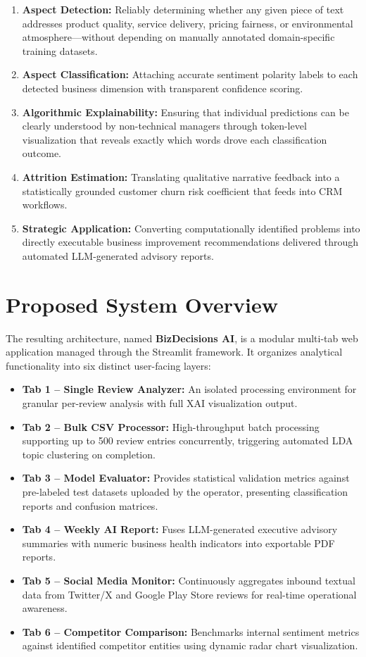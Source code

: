 \documentclass[12pt,a4paper]{report}
\begin{document}
\begin{enumerate}[leftmargin=2em]
  \item \textbf{Aspect Detection:} Reliably determining whether any given piece of text addresses product quality, service delivery, pricing fairness, or environmental atmosphere—without depending on manually annotated domain-specific training datasets.
  \item \textbf{Aspect Classification:} Attaching accurate sentiment polarity labels to each detected business dimension with transparent confidence scoring.
  \item \textbf{Algorithmic Explainability:} Ensuring that individual predictions can be clearly understood by non-technical managers through token-level visualization that reveals exactly which words drove each classification outcome.
  \item \textbf{Attrition Estimation:} Translating qualitative narrative feedback into a statistically grounded customer churn risk coefficient that feeds into CRM workflows.
  \item \textbf{Strategic Application:} Converting computationally identified problems into directly executable business improvement recommendations delivered through automated LLM-generated advisory reports.
\end{enumerate}

\section{Proposed System Overview}
The resulting architecture, named \textbf{BizDecisions AI}, is a modular multi-tab web application managed through the Streamlit framework. It organizes analytical functionality into six distinct user-facing layers:

\begin{itemize}[leftmargin=2em]
  \item \textbf{Tab 1 -- Single Review Analyzer:} An isolated processing environment for granular per-review analysis with full XAI visualization output.
  \item \textbf{Tab 2 -- Bulk CSV Processor:} High-throughput batch processing supporting up to 500 review entries concurrently, triggering automated LDA topic clustering on completion.
  \item \textbf{Tab 3 -- Model Evaluator:} Provides statistical validation metrics against pre-labeled test datasets uploaded by the operator, presenting classification reports and confusion matrices.
  \item \textbf{Tab 4 -- Weekly AI Report:} Fuses LLM-generated executive advisory summaries with numeric business health indicators into exportable PDF reports.
  \item \textbf{Tab 5 -- Social Media Monitor:} Continuously aggregates inbound textual data from Twitter/X and Google Play Store reviews for real-time operational awareness.
  \item \textbf{Tab 6 -- Competitor Comparison:} Benchmarks internal sentiment metrics against identified competitor entities using dynamic radar chart visualization.
\end{itemize}
\end{document}
